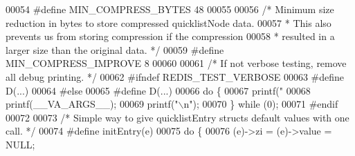 \begin{DoxyCode}
00054 \textcolor{preprocessor}{#}\textcolor{preprocessor}{define} \textcolor{preprocessor}{MIN\_COMPRESS\_BYTES} 48
00055 
00056 \textcolor{comment}{/* Minimum size reduction in bytes to store compressed quicklistNode data.}
00057 \textcolor{comment}{ * This also prevents us from storing compression if the compression}
00058 \textcolor{comment}{ * resulted in a larger size than the original data. */}
00059 \textcolor{preprocessor}{#}\textcolor{preprocessor}{define} \textcolor{preprocessor}{MIN\_COMPRESS\_IMPROVE} 8
00060 
00061 \textcolor{comment}{/* If not verbose testing, remove all debug printing. */}
00062 \textcolor{preprocessor}{#}\textcolor{preprocessor}{ifndef} \textcolor{preprocessor}{REDIS\_TEST\_VERBOSE}
00063 \textcolor{preprocessor}{#}\textcolor{preprocessor}{define} \textcolor{preprocessor}{D}\textcolor{preprocessor}{(}\textcolor{preprocessor}{...}\textcolor{preprocessor}{)}
00064 \textcolor{preprocessor}{#}\textcolor{preprocessor}{else}
00065 \textcolor{preprocessor}{#}\textcolor{preprocessor}{define} \textcolor{preprocessor}{D}\textcolor{preprocessor}{(}\textcolor{preprocessor}{...}\textcolor{preprocessor}{)}
00066     \textcolor{preprocessor}{do} \textcolor{preprocessor}{\{}
00067         \textcolor{preprocessor}{printf}\textcolor{preprocessor}{(}\textcolor{stringliteral}{"%
00068         \textcolor{preprocessor}{printf}\textcolor{preprocessor}{(}\textcolor{preprocessor}{\_\_VA\_ARGS\_\_}\textcolor{preprocessor}{)}\textcolor{preprocessor}{;}
00069         \textcolor{preprocessor}{printf}\textcolor{preprocessor}{(}\textcolor{stringliteral}{"\(\backslash\)n"}\textcolor{preprocessor}{)}\textcolor{preprocessor}{;}
00070     \textcolor{preprocessor}{\}} \textcolor{preprocessor}{while} \textcolor{preprocessor}{(}0\textcolor{preprocessor}{)}\textcolor{preprocessor}{;}
00071 \textcolor{preprocessor}{#}\textcolor{preprocessor}{endif}
00072 
00073 \textcolor{comment}{/* Simple way to give quicklistEntry structs default values with one call. */}
00074 \textcolor{preprocessor}{#}\textcolor{preprocessor}{define} \textcolor{preprocessor}{initEntry}\textcolor{preprocessor}{(}\textcolor{preprocessor}{e}\textcolor{preprocessor}{)}
00075     \textcolor{keywordflow}{do} \textcolor{preprocessor}{\{}
00076         \textcolor{preprocessor}{(}\textcolor{preprocessor}{e}\textcolor{preprocessor}{)}\textcolor{preprocessor}{->}\textcolor{preprocessor}{zi} \textcolor{preprocessor}{=} \textcolor{preprocessor}{(}\textcolor{preprocessor}{e}\textcolor{preprocessor}{)}\textcolor{preprocessor}{->}\textcolor{preprocessor}{value} \textcolor{preprocessor}{=} \textcolor{preprocessor}{NULL}\textcolor{preprocessor}{;}
}
\end{DoxyCode}
